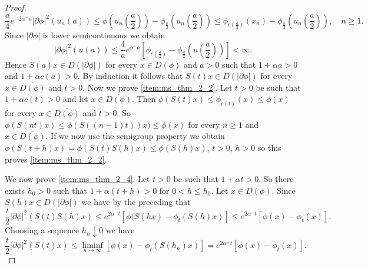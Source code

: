 \documentclass[a4paper,11pt, leqno]{scrreprt} %
\renewcommand{\leq}{\leqslant}
\renewcommand{\leq}{\leqslant}
\renewcommand{\geq}{\geqslant}
\theoremstyle{change}
\theoremstyle{nonumberplain}
\newtheorem{proof}{Proof}
\begin{document}
\begin{proof}
\begin{equation}
    \label{eq:ms_thm_2_34}
    \frac{a}{4} e^{-2 \alpha^- a} |\partial \phi|^2(u_n(a))
    \leq \phi \left ( u_n \left ( \frac{a}2 \right ) \right ) -
    \phi_{\frac{a}{2}} \left ( u_n \left ( \frac{a}2 \right ) \right )
    \leq \phi_{c \left ( \frac{a}{2} \right )} (x_n) -
    \phi_{\frac{a}{2}} \left ( u_n \left ( \frac{a}2 \right ) \right
    ), \quad n \geq 1.
  \end{equation}
  Since $|\partial \phi|$ is lower semicontinuous we obtain
  \begin{equation}
    \label{eq:ms_thm_2_35}
    |\partial \phi|^2(u(a)) \leq \frac{4}{a} e^{\alpha^- a} \left [ \phi_{c
      \left ( \frac{a}{2} \right )} - \phi_{\frac{a}{2}} \left ( u
      \left ( \frac{a}{2} \right ) \right ) \right ] < \infty.
  \end{equation}
  Hence $S(a)x \in D(|\partial \phi|)$ for every $x \in
  \overline{D(\phi)}$ and $a > 0$ such that $1 + \alpha a > 0$ and $1
  + \alpha c(a) > 0$. By induction it follows that $S(t)x \in
  D(|\partial \phi|)$ for every $x \in \overline{D(\phi)}$ and $t >
  0$. Now we prove \ref{item:ms_thm_2_2}. Let $t > 0$ be such that $1
  + \alpha c(t) > 0$ and let $x \in \overline{D(\phi)}$.  Then
  $\phi(S(t) x) \leq \phi_{c(t)}(x) \leq \phi(x)$ for every $x \in
  \overline{D(\phi)}$ and $t > 0$. So $\phi(S(nt)x) \leq \phi(S((n -
  1)t))x) \leq \phi(x)$ for every $n \geq 1$ and $x \in \overline{D(\phi)}$. If we now use the semigroup
  property we obtain $\phi(S(t + h)x) = \phi(S(t)S(h)x) \leq
  \phi(S(h)x)$, $t > 0$, $h > 0$ so this proves \ref{item:ms_thm_2_2}.

  We now prove \ref{item:ms_thm_2_4}. Let $t > 0$ be such that $1 +
  \alpha t > 0$. So there exists $h_0 > 0$ such that $1 + \alpha(t +
  h) > 0$ for $0 < h \leq h_0$. Let $x \in \overline{D(\phi)}$. Since
  $S(h)x \in D(|\partial \phi|)$ we have by the preceding that
  \begin{equation}
    \label{eq:ms_thm_2_36}
    \frac{t}2 |\partial \phi|^2(S(t)S(h)x) \leq e^{2 \alpha^-t}
    [\phi(S(hx) - \phi_t(S(h)x)] \leq e^{2 \alpha^- t} [\phi(x) - \phi_t(x)].
  \end{equation}
  Choosing a sequence $h_n \downarrow 0$ we have 
  \begin{equation}
    \label{eq:ms_thm_2_37}
    \frac{t}{2} |\partial \phi|^2(S(t)x) \leq \liminf_{n \to \infty}
    [\phi(x) - \phi_t(S(h_n)x)] = e^{2 \alpha^- t}[\phi(x) -
    \phi_t(x)].
  \end{equation}


\end{proof}
\end{document}
